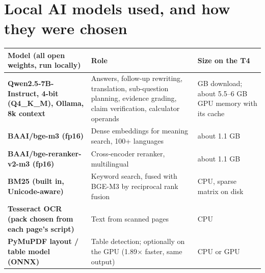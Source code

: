 \documentclass[10pt,a4paper]{article}
\begin{document}
\section{Local AI models used, and how they were chosen}
\renewcommand{\arraystretch}{1.18}
{\fontsize{8.4}{10.2}\selectfont
\begin{tabularx}{\textwidth}{@{}>{\raggedright\arraybackslash\bfseries}p{44mm} >{\raggedright\arraybackslash}X >{\raggedright\arraybackslash}p{42mm}@{}}
\toprule
\color{navy}Model (all open weights, run locally) & \color{navy}\textbf{Role} & \color{navy}\textbf{Size on the T4} \\ \midrule
Qwen2.5-7B-Instruct, 4-bit (Q4\_K\_M), Ollama, 8k context & Answers, follow-up rewriting, translation, sub-question planning, evidence grading, claim verification, calculator operands & 4.7 GB download; about 5.5--6 GB GPU memory with its cache \\
BAAI/bge-m3 (fp16) & Dense embeddings for meaning search, 100+ languages & about 1.1 GB \\
BAAI/bge-reranker-v2-m3 (fp16) & Cross-encoder reranker, multilingual & about 1.1 GB \\
BM25 (built in, Unicode-aware) & Keyword search, fused with BGE-M3 by reciprocal rank fusion & CPU, sparse matrix on disk \\
Tesseract OCR (pack chosen from each page's script) & Text from scanned pages & CPU \\
PyMuPDF layout / table model (ONNX) & Table detection; optionally on the GPU (1.89$\times$ faster, same output) & CPU or GPU \\
\bottomrule
\end{tabularx}}
\end{document}
